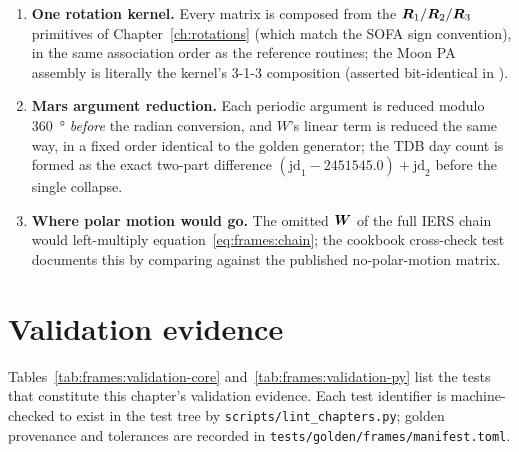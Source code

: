 \begin{enumerate}
    normalizes the angle.
  \item \textbf{One rotation kernel.} Every matrix is composed from the
    $\bm{R}_1/\bm{R}_2/\bm{R}_3$ primitives of
    Chapter~\ref{ch:rotations} (which match the SOFA sign convention), in
    the same association order as the reference routines; the Moon PA
    assembly is literally the kernel's 3-1-3 composition (asserted
    bit-identical in ).
  \item \textbf{Mars argument reduction.} Each periodic argument is
    reduced modulo \qty{360}{\degree} \emph{before} the radian conversion,
    and $W$'s linear term is reduced the same way, in a fixed order
    identical to the golden generator; the TDB day count is formed as the
    exact two-part difference $(\mathrm{jd}_1 - 2451545.0) +
    \mathrm{jd}_2$ before the single collapse.
  \item \textbf{Where polar motion would go.} The omitted $\bm{W}$ of
    the full IERS chain would left-multiply
    equation~\eqref{eq:frames:chain}; the cookbook cross-check test
    documents this by comparing against the published no-polar-motion
    matrix.
\end{enumerate}

\section{Validation evidence}
\label{sec:frames:validation}

Tables~\ref{tab:frames:validation-core}
and~\ref{tab:frames:validation-py} list the tests that constitute this
chapter's validation evidence. Each test identifier is machine-checked to
exist in the test tree by \texttt{scripts/lint\_chapters.py}; golden
provenance and tolerances are recorded in
\texttt{tests/golden/frames/manifest.toml}.

